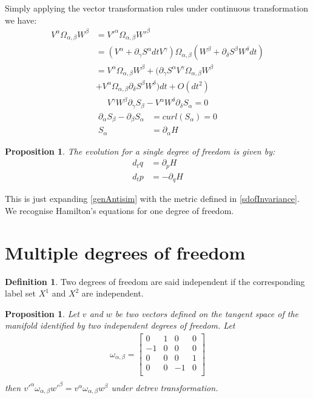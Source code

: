 \documentclass[twocolumn,floatfix,nofootinbib]{revtex4}   %
\theoremstyle{theorem}
\newtheorem{prop}[thm]{Proposition}
\theoremstyle{definition}
\newtheorem{defn}[thm]{Definition}
\begin{document}
Simply applying the vector transformation rules under continuous transformation we have:
\begin{align*}
V^{\alpha} \Omega_{\alpha, \beta} W^{\beta} &= V'^{\alpha} \Omega_{\alpha, \beta} W'^{\beta}  \\
&= (V^{\alpha} + \partial_{\gamma} S^{\alpha} dt V^{\gamma}) \Omega_{\alpha, \beta} ( W^{\beta} + \partial_{\delta} S^{\beta} W^{\delta} dt) \\
&= V^{\alpha} \Omega_{\alpha, \beta} W^{\beta} + (\partial_{\gamma} S^{\alpha} V^{\gamma} \Omega_{\alpha, \beta} W^{\beta} \\
 &+ V^{\alpha} \Omega_{\alpha, \beta} \partial_{\delta} S^{\beta} W^{\delta}) dt + O(dt^2)
\end{align*}
\begin{align*}
V^{\gamma} W^{\beta} \partial_{\gamma} S_{\beta} - V^{\alpha} W^{\delta} \partial_{\delta} S_{\alpha} = 0
\end{align*}
\begin{align*}
\partial_{\alpha} S_{\beta} - \partial_{\beta} S_{\alpha} &= curl(S_{\alpha}) = 0 \\
S_{\alpha} &= \partial_{\alpha}H
\end{align*}

\begin{prop}\label{sdofHam}
The evolution for a single degree of freedom is given by:
\begin{align*}
d_{t}q &= \partial_{p} H \\
d_{t}p &= - \partial_{q} H
\end{align*}
\end{prop}

This is just expanding \ref{genAntisim} with the metric defined in \ref{sdofInvariance}. We recognise Hamilton's equations for one degree of freedom.

\section{Multiple degrees of freedom}

\begin{defn}\label{mdof}
Two degrees of freedom are said independent if the corresponding label set $X^1$ and $X^2$ are independent.
\end{defn}

\begin{prop}\label{mdofInvariance}
Let $v$ and $w$ be two vectors defined on the tangent space of the manifold identified by two independent degrees of freedom. Let
\begin{align*}
\omega_{\alpha, \beta} = \left[
  \begin{array}{cccc}
    0 & 1 & 0 & 0 \\
    -1 & 0 & 0 & 0 \\
    0 & 0 & 0 & 1 \\
    0 & 0 & -1 & 0 \\
  \end{array}
\right] \\
\end{align*}
then $v'^{\alpha} \omega_{\alpha, \beta} w'^{\beta}=v^{\alpha} \omega_{\alpha, \beta} w^{\beta}$ under detrev transformation.
\end{prop}
\end{document}
